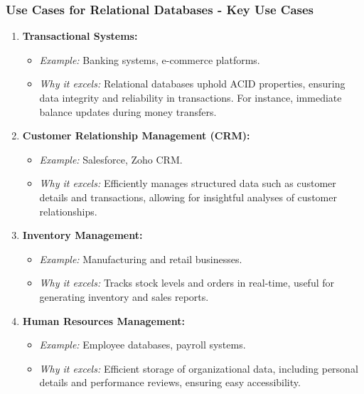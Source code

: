 \documentclass[aspectratio=169]{beamer}
\begin{document}
\begin{frame}[fragile]
    \frametitle{Use Cases for Relational Databases - Key Use Cases}
    \begin{enumerate}
        \item \textbf{Transactional Systems:}
            \begin{itemize}
                \item \textit{Example:} Banking systems, e-commerce platforms.
                \item \textit{Why it excels:} Relational databases uphold ACID properties, ensuring data integrity and reliability in transactions. For instance, immediate balance updates during money transfers.
            \end{itemize}
        
        \item \textbf{Customer Relationship Management (CRM):}
            \begin{itemize}
                \item \textit{Example:} Salesforce, Zoho CRM.
                \item \textit{Why it excels:} Efficiently manages structured data such as customer details and transactions, allowing for insightful analyses of customer relationships.
            \end{itemize}
        
        \item \textbf{Inventory Management:}
            \begin{itemize}
                \item \textit{Example:} Manufacturing and retail businesses.
                \item \textit{Why it excels:} Tracks stock levels and orders in real-time, useful for generating inventory and sales reports.
            \end{itemize}
        
        \item \textbf{Human Resources Management:}
            \begin{itemize}
                \item \textit{Example:} Employee databases, payroll systems.
                \item \textit{Why it excels:} Efficient storage of organizational data, including personal details and performance reviews, ensuring easy accessibility.
            \end{itemize}
    \end{enumerate}
\end{frame}
\end{document}
